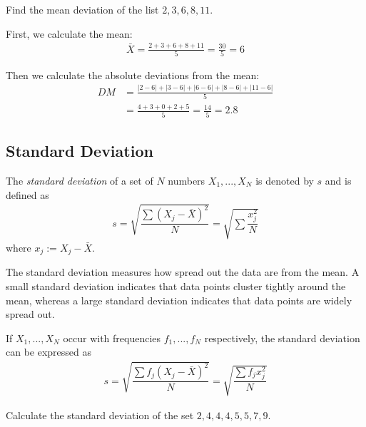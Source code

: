 \begin{example}
	Find the mean deviation of the list $2,3,6,8,11.$
\end{example}

\begin{solution}
	First, we calculate the mean:
	\begin{align}
		\bar{X} = \frac{2+3+6+8+11}{5} = \frac{30}{5} = 6
	\end{align}
	
	Then we calculate the absolute deviations from the mean:
	\begin{align}
		DM &= \frac{|2-6| + |3-6| + |6-6| + |8-6| + |11-6|}{5} \\
		&= \frac{4 + 3 + 0 + 2 + 5}{5} = \frac{14}{5} = 2.8
	\end{align}
\end{solution}


\subsection{Standard Deviation}
The \emph{standard deviation} of a set of $N$ numbers $X_{1},...,X_{N}$ is denoted by $s$ and is defined as
\begin{align}
	s=\sqrt{\dfrac{\sum\left( X_{j}-\bar{X} \right)^{2}}{N}}=\sqrt{\sum\dfrac{x_{j}^{2}}{N}}
\end{align} where $x_{j}:=X_{j}-\bar{X}.$

\begin{remark}
	The standard deviation measures how spread out the data are from the mean. A small standard deviation indicates that data points cluster tightly around the mean, whereas a large standard deviation indicates that data points are widely spread out.
\end{remark}

If $X_{1},...,X_{N}$ occur with frequencies $f_{1},...,f_{N}$ respectively, the standard deviation can be expressed as
\begin{align}
	s=\sqrt{\dfrac{\sum f_{j}\left( X_{j}-\bar{X} \right)^{2}}{N}}=\sqrt{\dfrac{\sum f_{j}x_{j}^{2}}{N}}
\end{align}

\begin{example}
	Calculate the standard deviation of the set $2, 4, 4, 4, 5, 5, 7, 9.$
\end{example}

